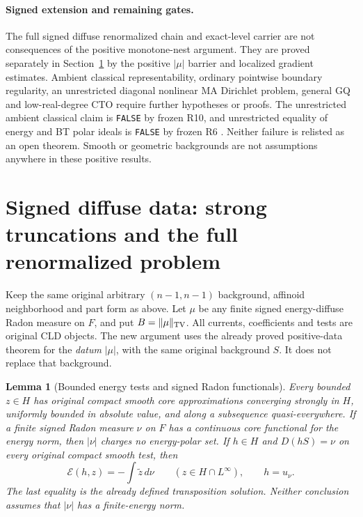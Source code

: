 \documentclass[11pt,a4paper]{article}
\numberwithin{equation}{section}
\newtheorem{lemma}[theorem]{Lemma}
\theoremstyle{definition}
\theoremstyle{remark}
\begin{document}
\paragraph{Signed extension and remaining gates.}
The full signed diffuse renormalized chain and exact-level carrier
are not consequences of the positive monotone-nest argument.
They are proved separately in
Section~\ref{sec:r11-signed-diffuse-renormalized} by the positive
$|\mu|$ barrier and localized gradient estimates.
Ambient classical representability, ordinary pointwise boundary
regularity, an unrestricted diagonal nonlinear MA Dirichlet
problem, general GQ and low-real-degree CTO require further
hypotheses or proofs.  The unrestricted ambient classical claim is
\texttt{FALSE} by frozen R10, and unrestricted equality of energy
and BT polar ideals is \texttt{FALSE} by frozen R6
.  Neither failure is relisted
as an open theorem.  Smooth or geometric backgrounds are not
assumptions anywhere in these positive results.



\section{Signed diffuse data: strong truncations and the full renormalized problem}
\label{sec:r11-signed-diffuse-renormalized}

Keep the same original arbitrary $(n-1,n-1)$ background, affinoid
neighborhood and part form as above.  Let $\mu$ be any finite
signed energy-diffuse Radon measure on $F$, and put
$B=\|\mu\|_{\rm TV}$.  All currents, coefficients and tests are
original CLD objects.  The new argument uses the already proved
positive-data theorem for the \emph{datum} $|\mu|$, with the same
original background $S$.  It does not replace that background.

\begin{lemma}[Bounded energy tests and signed Radon functionals]
\label{lem:r11-bounded-H-tests-diffuse}
Every bounded $z\in H$ has original compact smooth core
approximations converging strongly in $H$, uniformly bounded
in absolute value, and along a subsequence quasi-everywhere.
If a finite signed Radon measure $\nu$ on $F$ has a continuous
core functional for the energy norm, then $|\nu|$ charges no
energy-polar set.  If $h\in H$ and $D(hS)=\nu$ on every original
compact smooth test, then
\[
       \mathcal E(h,z)=-\int\widetilde z\,d\nu
                     \qquad(z\in H\cap L^\infty),
       \qquad h=u_\nu .
 \tag{SD1}
\]
The last equality is the already defined transposition solution.
Neither conclusion assumes that $|\nu|$ has a finite-energy norm.
\end{lemma}
\end{document}
